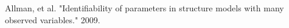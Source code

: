 \documentclass[preview]{standalone}
\begin{document}
\begin{center}
Allman, et al. "Identifiability of parameters in structure models with many observed variables." 2009.
\end{center}
\end{document}
